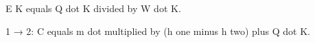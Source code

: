 E K equals Q dot K divided by W dot K.  

1 → 2:  
C equals m dot multiplied by (h one minus h two) plus Q dot K.